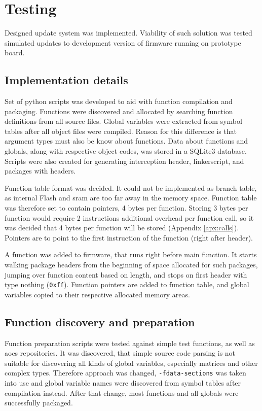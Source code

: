 \newpage
\section{Testing}

Designed update system was implemented. Viability of such solution was tested simulated updates to development version of firmware running on prototype board.

\subsection{Implementation details}

Set of python scripts was developed to aid with function compilation and packaging. Functions were discovered and allocated by searching function definitions from all source files. Global variables were extracted from symbol tables after all object files were compiled. Reason for this difference is that argument types must also be know about functions. Data about functions and globals, along with respective object codes, was stored in a SQLite3 database. Scripts were also created for generating interception header, linkerscript, and packages with headers.

Function table format was decided. It could not be implemented as branch table, as internal Flash and \gls{sram} are too far away in the memory space. Function table was therefore set to contain pointers, 4 bytes per function. Storing 3 bytes per function would require 2 instructions additional overhead per function call, so it was decided that 4 bytes per function will be stored (Appendix \ref{apx:calls}). Pointers are to point to the first instruction of the function (right after header).

A function was added to firmware, that runs right before main function. It starts walking package headers from the beginning of space allocated for such packages, jumping over function content based on length, and stops on first header with type nothing (\texttt{0xff}). Function pointers are added to function table, and global variables copied to their respective allocated memory areas.

\subsection{Function discovery and preparation}

Function preparation scripts were tested against simple test functions, as well as \gls{aocs} repositories. It was discovered, that simple source code parsing is not suitable for discovering all kinds of global variables, especially matrices and other complex types. Therefore approach was changed, \texttt{-fdata-sections} was taken into use and global variable names were discovered from symbol tables after compilation instead. After that change, most functions and all globals were successfully packaged.

